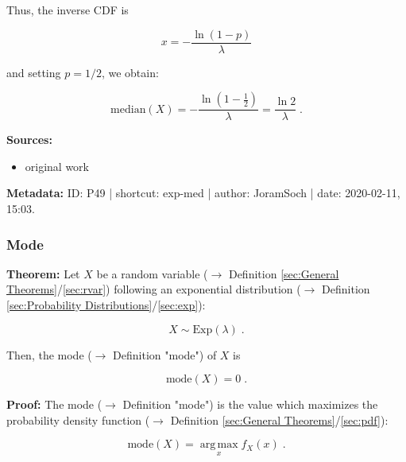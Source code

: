 \documentclass[a4paper,12pt,twoside]{book}
\begin{document}
Thus, the inverse CDF is

\begin{equation} \label{eq:exp-med-exp-cdf-inv}
x = -\frac{\ln(1-p)}{\lambda}
\end{equation}

and setting $p = 1/2$, we obtain:

\begin{equation} \label{eq:exp-med-exp-med-qed}
\mathrm{median}(X) = -\frac{\ln(1-\frac{1}{2})}{\lambda} = \frac{\ln 2}{\lambda} \; .
\end{equation}


\vspace{1em}
\textbf{Sources:}
\begin{itemize}
\item original work\end{itemize}


\vspace{1em}
\textbf{Metadata:} ID: P49 | shortcut: exp-med | author: JoramSoch | date: 2020-02-11, 15:03.
\vspace{1em}



\subsubsection[\textbf{Mode}]{Mode} \label{sec:exp-mode}
\setcounter{equation}{0}

\textbf{Theorem:} Let $X$ be a random variable ($\rightarrow$ Definition \ref{sec:General Theorems}/\ref{sec:rvar}) following an exponential distribution ($\rightarrow$ Definition \ref{sec:Probability Distributions}/\ref{sec:exp}):

\begin{equation} \label{eq:exp-mode-exp}
X \sim \mathrm{Exp}(\lambda) \; .
\end{equation}

Then, the mode ($\rightarrow$ Definition "mode") of $X$ is

\begin{equation} \label{eq:exp-mode-exp-mode}
\mathrm{mode}(X) = 0 \; .
\end{equation}


\vspace{1em}
\textbf{Proof:}  The mode ($\rightarrow$ Definition "mode") is the value which maximizes the probability density function ($\rightarrow$ Definition \ref{sec:General Theorems}/\ref{sec:pdf}):

\begin{equation} \label{eq:exp-mode-mode}
\mathrm{mode}(X) = \operatorname*{arg\,max}_x f_X(x) \; .
\end{equation}
\end{document}
